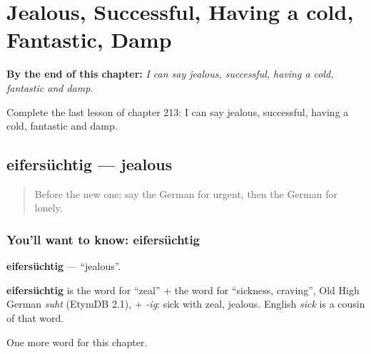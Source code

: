 
\chapter{Jealous, Successful, Having a cold, Fantastic, Damp}
\label{ch:ge-jealous-successful-having-a-cold-fantastic-damp}

\begin{chapteropening}
\textbf{By the end of this chapter:} \emph{I can say jealous, successful, having a cold, fantastic and damp.}

Complete the last lesson of chapter 213: I can say jealous, successful, having a cold, fantastic and damp.
\end{chapteropening}

\section[eifersüchtig]{eifersüchtig — jealous}

\label{lesson:GE-C213-eifersuechtig}



\begin{quote}
Before the new one: say the German for urgent, then the German for lonely.
\end{quote}

\subsection*{You'll want to know: eifersüchtig}
\textbf{eifersüchtig} — \textquotedblleft{}jealous\textquotedblright{}.

\begin{cousinweb}
\textbf{eifersüchtig} is the word for \textquotedblleft{}zeal\textquotedblright{} + the word for \textquotedblleft{}sickness, craving\textquotedblright{}, Old High German \emph{suht} (EtymDB 2.1), + \emph{-ig}: sick with zeal, jealous. English \emph{sick} is a cousin of that word.
\end{cousinweb}

\begin{grammarlens}[title={What you've built}]
One more word for this chapter.
\end{grammarlens}

